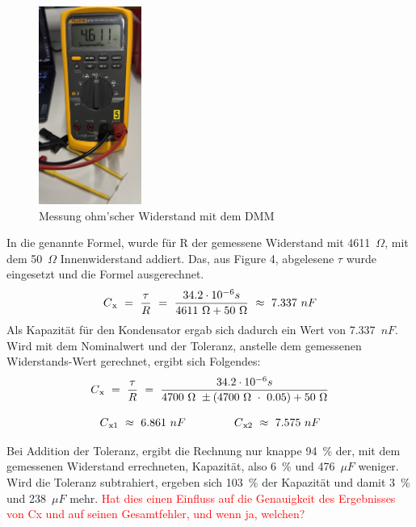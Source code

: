 \documentclass[a4paper,12pt]{article}
\begin{document}
\begin{figure}[H]
    \centering
    \includegraphics[width=0.3\textwidth]{../Quellen/Labor2/Fotos/IMG_3963gezoomt.jpeg}
\caption{Messung ohm'scher Widerstand mit dem DMM}
\end{figure}

\noindent In die genannte Formel, wurde für R der gemessene Widerstand mit 4611~$\Omega$, mit dem 50~$\Omega$ Innenwiderstand addiert. Das, aus Figure 4, abgelesene $\tau$ wurde eingesetzt und die Formel ausgerechnet.
\[
C\textsubscript{x} ~=~ \frac{\tau}{R} ~=~ \frac{34.2 \cdot 10^{-6}s}{4611~\Omega + 50~\Omega} ~\approx~ 7.337~nF
\]
\noindent Als Kapazität für den Kondensator ergab sich dadurch ein Wert von 7.337~$nF$.\\
Wird mit dem Nominalwert und der Toleranz, anstelle dem gemessenen Widerstands-Wert gerechnet, ergibt sich Folgendes:
\[
C\textsubscript{x} ~=~ \frac{\tau}{R} ~=~ \frac{34.2 \cdot 10^{-6}s}{4700~\Omega~\pm(4700~\Omega~\cdot~0.05) + 50~\Omega}
\]

\[
C\textsubscript{x1}~\approx~ 6.861~nF~~~~~~~~~~~~~
C\textsubscript{x2}~\approx~ 7.575~nF
\]

\noindent Bei Addition der Toleranz, ergibt die Rechnung nur knappe 94~\% der, mit dem gemessenen Widerstand errechneten, Kapazität, also 6~\% und 476~$\mu F$ weniger. Wird die Toleranz subtrahiert, ergeben sich 103~\% der Kapazität und damit 3~\% und 238~$\mu F$ mehr.
\textcolor{red}{Hat dies einen Einfluss auf die Genauigkeit des Ergebnisses von Cx und auf seinen Gesamtfehler, und wenn ja, welchen?}
\end{document}
